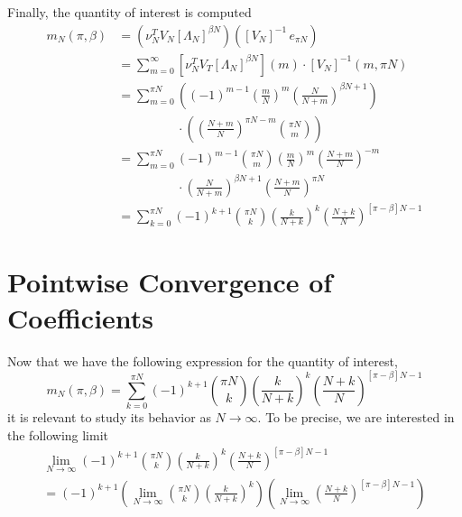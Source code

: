 \documentclass{article}
\newcommand{\ppar}[1]{\left( #1 \right)}
\newcommand{\spar}[1]{\left[ #1 \right]}
\begin{document}

Finally, the quantity of interest is computed
\begin{align*}
    m_N(\pi, \beta) 
    &=
    \ppar{\nu_N^T V_N \spar{\Lambda_N}^{\beta N}} \ppar{\spar{V_N}^{-1}\,e_{\pi N}}
    \\
    &=
    \sum_{m=0}^\infty 
    \spar{\nu_N^T V_T \spar{\Lambda_N}^{\beta N}}(m) \cdot
    \spar{V_N}^{-1}(m, \pi N)
    \\
    &=
    \sum_{m=0}^{\pi N}
    \ppar{(-1)^{m-1} \ppar{\frac{m}{N}}^m
    \ppar{\frac{N}{N+m}}^{\beta N+1}}
    \\
    &\phantom{=}
    \phantom{\sum_{m=0}^{\pi N}} \cdot
    \ppar{\ppar{\frac{N+m}{N}}^{\pi N-m} \binom{\pi N}{m}}
    \\
    &=
    \sum_{m=0}^{\pi N}
    (-1)^{m-1} \binom{\pi N}{m}
    \ppar{\frac{m}{N}}^m \ppar{\frac{N+m}{N}}^{-m}
    \\
    &\phantom{=}
    \phantom{\sum_{m=0}^{\pi N}} \cdot
    \ppar{\frac{N}{N+m}}^{\beta N+1}
    \ppar{\frac{N+m}{N}}^{\pi N}
    \\
    &=
    \sum_{k=0}^{\pi N}
    (-1)^{k+1} 
    \binom{\pi N}{k}
    \ppar{\frac{k}{N+k}}^k
    \ppar{\frac{N+k}{N}}^{\spar{\pi-\beta} N -1}
\end{align*}

\section{Pointwise Convergence of Coefficients}
\label{ap:coeff}

Now that we have the following expression for the quantity of interest,
\begin{equation}
    m_N(\pi, \beta) =
    \sum_{k=0}^{\pi N}
    (-1)^{k+1} 
    \binom{\pi N}{k}
    \ppar{\frac{k}{N+k}}^k
    \ppar{\frac{N+k}{N}}^{\spar{\pi-\beta} N -1}
\end{equation}
it is relevant to study its behavior as $N\rightarrow \infty$. 
%
To be precise, we are interested in the following limit
\begin{multline}
    \lim_{N \rightarrow \infty}
    (-1)^{k+1} 
    \binom{\pi N}{k}
    \ppar{\frac{k}{N+k}}^k
    \ppar{\frac{N+k}{N}}^{\spar{\pi-\beta} N -1}
    \\
    =
    (-1)^{k+1}
    \ppar{\lim_{N \rightarrow \infty}
    \binom{\pi N}{k}
    \ppar{\frac{k}{N+k}}^k}
    \ppar{\lim_{N \rightarrow \infty}
    \ppar{\frac{N+k}{N}}^{\spar{\pi-\beta} N -1}}
\end{multline}
\end{document}

